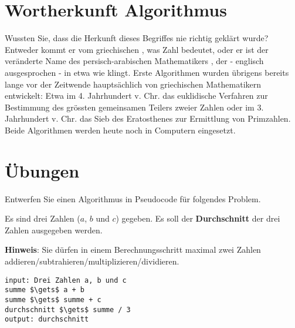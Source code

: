 \section{Wortherkunft Algorithmus}

\begin{fancyquotes} 
Wussten Sie, dass die Herkunft dieses Begriffes nie richtig geklärt wurde? Entweder kommt er vom griechischen , was Zahl bedeutet, oder er ist der veränderte Name des persisch-arabischen Mathematikers , der - englisch ausgesprochen - in etwa wie  klingt. Erste Algorithmen wurden übrigens bereits lange vor der Zeitwende hauptsächlich von griechischen Mathematikern entwickelt: Etwa im 4. Jahrhundert v. Chr. das euklidische Verfahren zur Bestimmung des grössten gemeinsamen Teilers zweier Zahlen oder im 3. Jahrhundert v. Chr. das Sieb des Eratosthenes zur Ermittlung von Primzahlen. Beide Algorithmen werden heute noch in Computern eingesetzt.	
\end{fancyquotes}

\section{Übungen}

\begin{exercise}
Entwerfen Sie einen Algorithmus in Pseudocode für folgendes Problem.

\begin{problem}\label{problem-durchschnitt-3-zahlen}
Es sind drei Zahlen ($a$, $b$ und $c$) gegeben. Es soll der \textbf{Durchschnitt} der drei Zahlen ausgegeben werden.
\end{problem}

\textbf{Hinweis}: Sie dürfen in einem Berechnungsschritt maximal zwei Zahlen addieren/subtrahieren/multiplizieren/dividieren.

\fillwithgrid	{1.25in}
\end{exercise}
\begin{solution}
\begin{minipage}{\linewidth}
\begin{lstlisting}[language=pseudocode, caption={Algorithmus für das Problem \protect\autoref{problem-durchschnitt-3-zahlen}}]
input: Drei Zahlen a, b und c
summe $\gets$ a + b
summe $\gets$ summe + c
durchschnitt $\gets$ summe / 3
output: durchschnitt 
\end{lstlisting}
\end{minipage}
\vfill
\end{solution}

